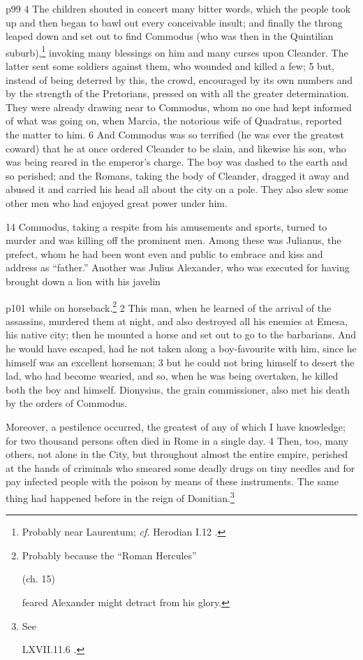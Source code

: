 p99 4 The children shouted in concert many bitter words, which the people took up and then began to bawl out every conceivable insult; and finally the throng leaped down and set out to find Commodus (who was then in the Quintilian suburb),\texthebrew{⁠}\footnote{Probably near Laurentum; \emph{cf.} Herodian I.12 .

} invoking many blessings on him and many curses upon Cleander. The latter sent some soldiers against them, who wounded and killed a few; 5 but, instead of being deterred by this, the crowd, encouraged by its own numbers and by the strength of the Pretorians, pressed on with all the greater determination. They were already drawing near to Commodus, whom no one had kept informed of what was going on, when Marcia, the notorious wife of Quadratus, reported the matter to him. 6 And Commodus was so terrified (he was ever the greatest coward) that he at once ordered Cleander to be slain, and likewise his son, who was being reared in the emperor's charge. The boy was dashed to the earth and so perished; and the Romans, taking the body of Cleander, dragged it away and abused it and carried his head all about the city on a pole. They also slew some other men who had enjoyed great power under him.

14
Commodus, taking a respite from his amusements and sports, turned to murder and was killing off the prominent men. Among these was Julianus, the prefect, whom he had been wont even and public to embrace and kiss and address as ``father.'' Another was Julius Alexander, who was executed for having brought down a lion with his javelin

p101 while on horseback.\texthebrew{⁠}\footnote{Probably because the ``Roman Hercules''

(ch. 15)

feared Alexander might detract from his glory.

} 2 This man, when he learned of the arrival of the assassins, murdered them at night, and also destroyed all his enemies at Emesa, his native city; then he mounted a horse and set out to go to the barbarians. And he would have escaped, had he not taken along a boy-favourite with him, since he himself was an excellent horseman; 3 but he could not bring himself to desert the lad, who had become wearied, and so, when he was being overtaken, he killed both the boy and himself. Dionysius, the grain commissioner, also met his death by the orders of Commodus.

Moreover, a pestilence occurred, the greatest of any of which I have knowledge; for two thousand persons often died in Rome in a single day. 4 Then, too, many others, not alone in the City, but throughout almost the entire empire, perished at the hands of criminals who smeared some deadly drugs on tiny needles and for pay infected people with the poison by means of these instruments. The same thing had happened before in the reign of Domitian.\footnote{See

LXVII.11.6 .

}

